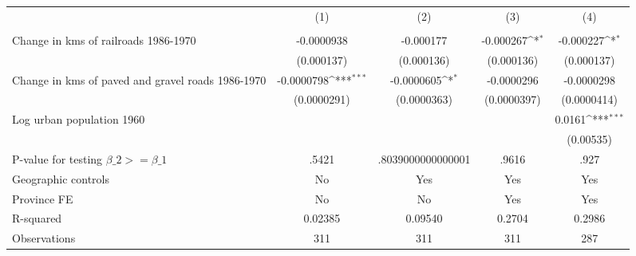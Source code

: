 {
\def\sym#1{\ifmmode^{#1}\else\(^{#1}\)\fi}
\begin{tabular}{l*{4}{c}}
\hline\hline
                &\multicolumn{1}{c}{(1)}&\multicolumn{1}{c}{(2)}&\multicolumn{1}{c}{(3)}&\multicolumn{1}{c}{(4)}\\
                &\multicolumn{1}{c}{}&\multicolumn{1}{c}{}&\multicolumn{1}{c}{}&\multicolumn{1}{c}{}\\
\hline
Change in kms of railroads 1986-1970&-0.0000938         &-0.000177         &-0.000267\sym{*}  &-0.000227\sym{*}  \\
                &(0.000137)         &(0.000136)         &(0.000136)         &(0.000137)         \\
[1em]
Change in kms of paved and gravel roads 1986-1970&-0.0000798\sym{***}&-0.0000605\sym{*}  &-0.0000296         &-0.0000298         \\
                &(0.0000291)         &(0.0000363)         &(0.0000397)         &(0.0000414)         \\
[1em]
Log urban population 1960&                  &                  &                  &   0.0161\sym{***}\\
                &                  &                  &                  &(0.00535)         \\
\hline
P-value for testing $\beta\_{2} >= \beta\_{1}$&    .5421         &.8039000000000001         &    .9616         &     .927         \\
Geographic controls&       No         &      Yes         &      Yes         &      Yes         \\
Province FE     &       No         &       No         &      Yes         &      Yes         \\
R-squared       &  0.02385         &  0.09540         &   0.2704         &   0.2986         \\
Observations    &      311         &      311         &      311         &      287         \\
\hline\hline
\end{tabular}
}
